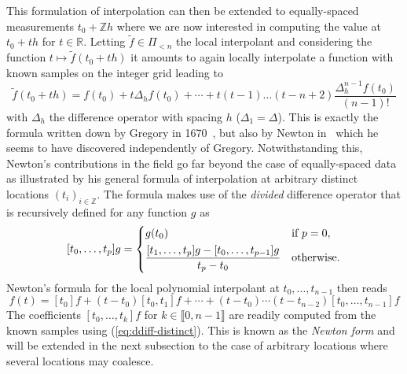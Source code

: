 This formulation of interpolation can then be extended to equally-spaced measurements $t_0 + \mathbb{Z}h$ where we are 
now interested in computing the value at $t_0 + th$ for $t \in \mathbb{R}$. Letting $\tilde{f} \in \Pi_{<n}$ the local 
interpolant and considering the function $t \mapsto \tilde{f}(t_0 + th)$ it amounts to again locally interpolate a 
function with known samples on the integer grid leading to  \begin{equation*}
  \tilde{f}(t_0 + th) = f(t_0) + t\Delta_{h}f(t_0) + \cdots + t(t-1)\ldots(t-n+2)\frac{\Delta_{h}^{n-1} f(t_0)}{(n-1)!}
\end{equation*}
with $\Delta_{h}$ the difference operator with spacing $h$ ($\Delta_1 = \Delta$). This is exactly the formula written 
down by Gregory in 1670~\cite{gregory_letter_1670}, but also by Newton in~\cite[Book III, Lemma 
V]{newton_philosophiae_1960} which he seems to have discovered independently of Gregory.  Notwithstanding this, Newton's 
contributions in the field go far beyond the case of equally-spaced data as illustrated by his general formula of 
interpolation at arbitrary distinct locations ${(t_i)}_{i \in \mathbb{Z}}$. The formula makes use of the \emph{divided} 
difference operator that is recursively defined for any function $g$ as
\begin{equation}
  \label{eq:ddiff-distinct}
  [t_{0}, \ldots, t_{p}] g=
  \begin{dcases}
    g(t_0) & \text{if} \ p=0,\\
    \frac{[t_{1}, \ldots, t_{p}]g - [t_0, \ldots, t_{p-1}]g}{t_{p}-t_0} & \text{otherwise}.
  \end{dcases}
\end{equation}
Newton's formula for the local polynomial interpolant at $t_0, \ldots, t_{n-1}$ then reads
\begin{equation}
  \label{eq:Newton}
  f(t) = [t_0]f + (t-t_0)[t_0, t_1]f + \cdots + (t-t_0)\cdots(t-t_{n-2})[t_0, \ldots, t_{n-1}]f
\end{equation}
The coefficients $[t_0, \ldots, t_k]f$ for $k \in \llbracket0,n-1\rrbracket$ are readily computed from the known samples 
using (\ref{eq:ddiff-distinct}). This is known as the \emph{Newton form} and will be extended in the next subsection to 
the case of arbitrary locations where several locations may coalesce. 

